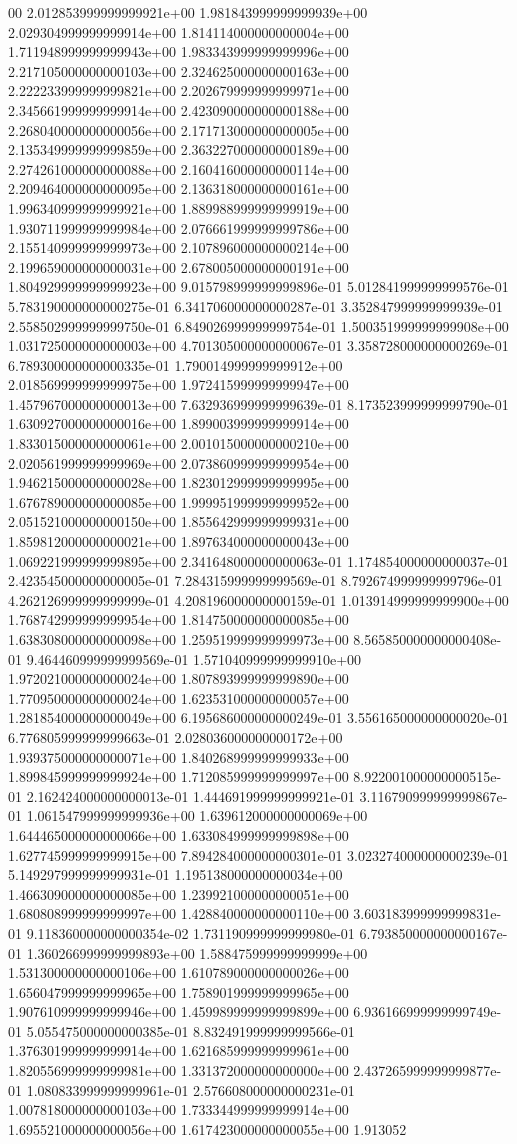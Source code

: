 00	2.012853999999999921e+00	1.981843999999999939e+00	2.029304999999999914e+00	1.814114000000000004e+00	1.711948999999999943e+00	1.983343999999999996e+00	2.217105000000000103e+00	2.324625000000000163e+00	2.222233999999999821e+00	2.202679999999999971e+00	2.345661999999999914e+00	2.423090000000000188e+00	2.268040000000000056e+00	2.171713000000000005e+00	2.135349999999999859e+00	2.363227000000000189e+00	2.274261000000000088e+00	2.160416000000000114e+00	2.209464000000000095e+00	2.136318000000000161e+00	1.996340999999999921e+00	1.889988999999999919e+00	1.930711999999999984e+00	2.076661999999999786e+00	2.155140999999999973e+00	2.107896000000000214e+00	2.199659000000000031e+00	2.678005000000000191e+00	1.804929999999999923e+00	9.015798999999999896e-01	5.012841999999999576e-01	5.783190000000000275e-01	6.341706000000000287e-01	3.352847999999999939e-01	2.558502999999999750e-01	6.849026999999999754e-01	1.500351999999999908e+00	1.031725000000000003e+00	4.701305000000000067e-01	3.358728000000000269e-01	6.789300000000000335e-01	1.790014999999999912e+00	2.018569999999999975e+00	1.972415999999999947e+00	1.457967000000000013e+00	7.632936999999999639e-01	8.173523999999999790e-01	1.630927000000000016e+00	1.899003999999999914e+00	1.833015000000000061e+00	2.001015000000000210e+00	2.020561999999999969e+00	2.073860999999999954e+00	1.946215000000000028e+00	1.823012999999999995e+00	1.676789000000000085e+00	1.999951999999999952e+00	2.051521000000000150e+00	1.855642999999999931e+00	1.859812000000000021e+00	1.897634000000000043e+00	1.069221999999999895e+00	2.341648000000000063e-01	1.174854000000000037e-01	2.423545000000000005e-01	7.284315999999999569e-01	8.792674999999999796e-01	4.262126999999999999e-01	4.208196000000000159e-01	1.013914999999999900e+00	1.768742999999999954e+00	1.814750000000000085e+00	1.638308000000000098e+00	1.259519999999999973e+00	8.565850000000000408e-01	9.464460999999999569e-01	1.571040999999999910e+00	1.972021000000000024e+00	1.807893999999999890e+00	1.770950000000000024e+00	1.623531000000000057e+00	1.281854000000000049e+00	6.195686000000000249e-01	3.556165000000000020e-01	6.776805999999999663e-01	2.028036000000000172e+00	1.939375000000000071e+00	1.840268999999999933e+00	1.899845999999999924e+00	1.712085999999999997e+00	8.922001000000000515e-01	2.162424000000000013e-01	1.444691999999999921e-01	3.116790999999999867e-01	1.061547999999999936e+00	1.639612000000000069e+00	1.644465000000000066e+00	1.633084999999999898e+00	1.627745999999999915e+00	7.894284000000000301e-01	3.023274000000000239e-01	5.149297999999999931e-01	1.195138000000000034e+00	1.466309000000000085e+00	1.239921000000000051e+00	1.680808999999999997e+00	1.428840000000000110e+00	3.603183999999999831e-01	9.118360000000000354e-02	1.731190999999999980e-01	6.793850000000000167e-01	1.360266999999999893e+00	1.588475999999999999e+00	1.531300000000000106e+00	1.610789000000000026e+00	1.656047999999999965e+00	1.758901999999999965e+00	1.907610999999999946e+00	1.459989999999999899e+00	6.936166999999999749e-01	5.055475000000000385e-01	8.832491999999999566e-01	1.376301999999999914e+00	1.621685999999999961e+00	1.820556999999999981e+00	1.331372000000000000e+00	2.437265999999999877e-01	1.080833999999999961e-01	2.576608000000000231e-01	1.007818000000000103e+00	1.733344999999999914e+00	1.695521000000000056e+00	1.617423000000000055e+00	1.913052